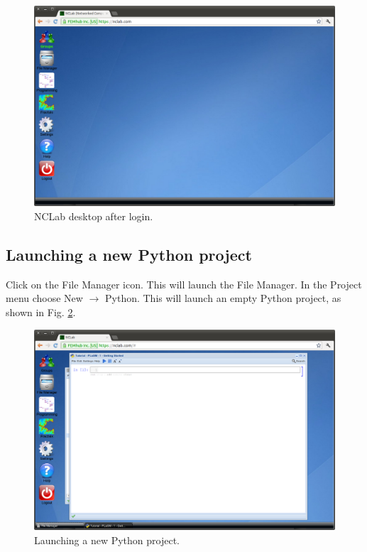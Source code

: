\documentclass[article,A4,12pt]{llncs}
\begin{document}
\begin{figure}[!ht]
\begin{center}
\includegraphics[width=\textwidth]{img/desktop.png}
\end{center}
\caption{NCLab desktop after login.}
\label{fig:desktop}
\end{figure}

\subsection{Launching a new Python project}

Click on the File Manager icon. This will launch the File Manager.
In the Project menu choose New $\rightarrow$ Python. This will launch an 
empty Python project, as shown in Fig. \ref{fig:python}.

\newpage

\begin{figure}[!ht]
\begin{center}
\includegraphics[width=\textwidth]{img/python.png}
\end{center}
\caption{Launching a new Python project.}
\label{fig:python}
\end{figure}
\noindent
\end{document}
